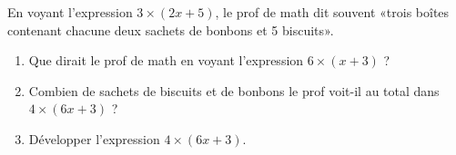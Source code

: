 
\begin{exercice}\label{exo2smath-0198}

    En voyant l'expression \( 3\times (2x+5)\), le prof de math dit souvent «trois boîtes contenant chacune deux sachets de bonbons et 5 biscuits».

    \begin{enumerate}
        \item
            Que dirait le prof de math en voyant l'expression \( 6\times (x+3)\) ?
        \item
            Combien de sachets de biscuits et de bonbons le prof voit-il au total dans \( 4\times (6x+3)\) ?
        \item
            Développer l'expression \( 4\times (6x+3)\).
    \end{enumerate}

\end{exercice}

